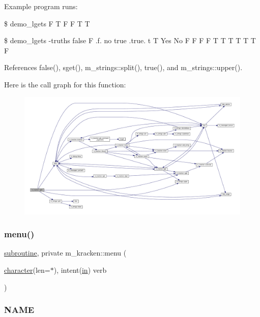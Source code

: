 Example program runs\+:

\$ demo\+\_\+lgets F T F F T T

\$ demo\+\_\+lgets -\/truths false F .f. no true .true. t T Yes No F F F F T T T T T T F 

References false(), sget(), m\+\_\+strings\+::split(), true(), and m\+\_\+strings\+::upper().

Here is the call graph for this function\+:
\nopagebreak
\begin{figure}[H]
\begin{center}
\leavevmode
\includegraphics[width=350pt]{namespacem__kracken_afb3f3b45b78625758818ea9bef463fd9_cgraph}
\end{center}
\end{figure}
\mbox{\label{namespacem__kracken_ad0cfac1dcc02e0a67841f546cb57f823}} 
\subsubsection{\texorpdfstring{menu()}{menu()}}
{\footnotesize\ttfamily \hyperlink{M__stopwatch_83_8txt_acfbcff50169d691ff02d4a123ed70482}{subroutine}, private m\+\_\+kracken\+::menu (\begin{DoxyParamCaption}\item[{\hyperlink{option__stopwatch_83_8txt_abd4b21fbbd175834027b5224bfe97e66}{character}(len=$\ast$), intent(\hyperlink{M__journal_83_8txt_afce72651d1eed785a2132bee863b2f38}{in})}]{verb }\end{DoxyParamCaption})\hspace{0.3cm}{\ttfamily [private]}}



\subsubsection*{N\+A\+ME}

